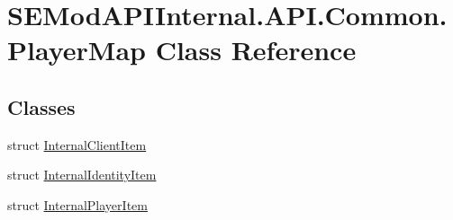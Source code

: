 \hypertarget{class_s_e_mod_a_p_i_internal_1_1_a_p_i_1_1_common_1_1_player_map}{}\section{S\+E\+Mod\+A\+P\+I\+Internal.\+A\+P\+I.\+Common.\+Player\+Map Class Reference}
\label{class_s_e_mod_a_p_i_internal_1_1_a_p_i_1_1_common_1_1_player_map}
\subsection*{Classes}
\begin{DoxyCompactItemize}
\item 
struct \hyperlink{struct_s_e_mod_a_p_i_internal_1_1_a_p_i_1_1_common_1_1_player_map_1_1_internal_client_item}{Internal\+Client\+Item}
\item 
struct \hyperlink{struct_s_e_mod_a_p_i_internal_1_1_a_p_i_1_1_common_1_1_player_map_1_1_internal_identity_item}{Internal\+Identity\+Item}
\item 
struct \hyperlink{struct_s_e_mod_a_p_i_internal_1_1_a_p_i_1_1_common_1_1_player_map_1_1_internal_player_item}{Internal\+Player\+Item}
\end{DoxyCompactItemize}
